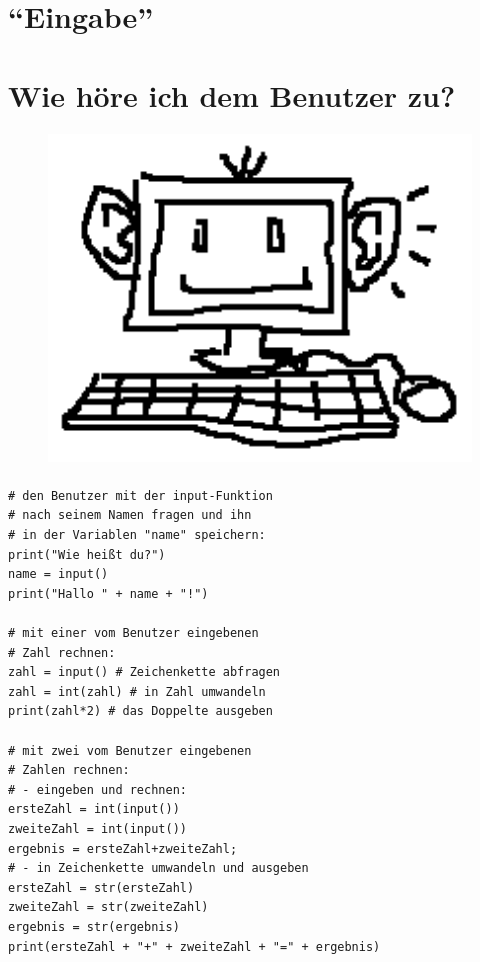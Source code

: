



	\begin{center}
		\section*{\enquote{Eingabe}}
		\section*{Wie höre ich dem Benutzer zu?}	
	\end{center}
	
	\paragraph*{}
	\paragraph*{}
	
	\begin{figure}[htbp]
		\centering
		\includegraphics[width=1\textwidth]{img/eingabe.png}
		\label{eingabe}
	\end{figure}
	
	
	\newpage
	
	\paragraph*{}
	\begin{lstlisting}
# den Benutzer mit der input-Funktion 
# nach seinem Namen fragen und ihn
# in der Variablen "name" speichern:
print("Wie heißt du?")
name = input()
print("Hallo " + name + "!")

# mit einer vom Benutzer eingebenen
# Zahl rechnen:
zahl = input() # Zeichenkette abfragen
zahl = int(zahl) # in Zahl umwandeln
print(zahl*2) # das Doppelte ausgeben

# mit zwei vom Benutzer eingebenen
# Zahlen rechnen:
# - eingeben und rechnen:
ersteZahl = int(input())
zweiteZahl = int(input())
ergebnis = ersteZahl+zweiteZahl;
# - in Zeichenkette umwandeln und ausgeben
ersteZahl = str(ersteZahl)
zweiteZahl = str(zweiteZahl)
ergebnis = str(ergebnis)
print(ersteZahl + "+" + zweiteZahl + "=" + ergebnis)
	\end{lstlisting}
	
	
	
